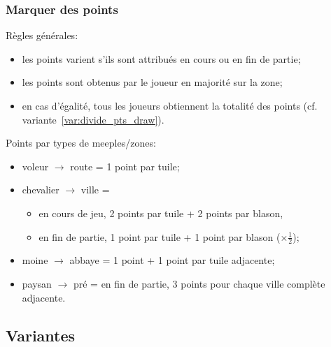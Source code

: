 \documentclass[11pt]{beamer}
\begin{document}
\begin{frame}
	\frametitle{Marquer des points}
	\label{frame:score}
	
	Règles générales:
	\begin{itemize}
		\item les points varient s'ils sont attribués en cours ou en fin de partie;
		\item les points sont obtenus par le joueur en majorité sur la zone;
		\item en cas d'égalité, tous les joueurs obtiennent la totalité des points (cf. variante~\ref{var:divide_pts_draw}).
	\end{itemize}

	\vspace*{1ex}
	
	Points par types de meeples/zones:
	\begin{itemize}
		\item voleur $\rightarrow$ route = 1 point par tuile;
		\item chevalier $\rightarrow$ ville =
		\begin{itemize}
			\item en cours de jeu, 2 points par tuile + 2 points par blason,
			\item en fin de partie, 1 point par tuile + 1 point par blason ($\times\frac{1}{2}$);
		\end{itemize}
		\item moine $\rightarrow$ abbaye = 1 point + 1 point par tuile adjacente;
		\item paysan $\rightarrow$ pré = en fin de partie, 3 points pour chaque ville complète adjacente.
	\end{itemize}
\end{frame}


	\subsection{Variantes}
\end{document}

